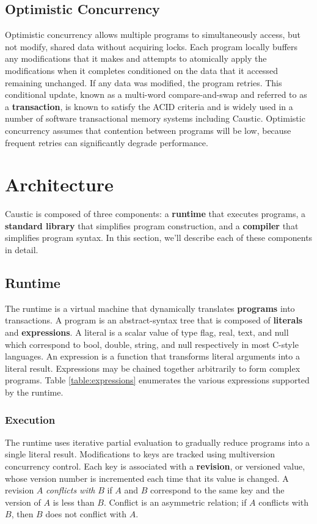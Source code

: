 \documentclass[12pt]{article}
\begin{document}
\subsection{Optimistic Concurrency}
Optimistic concurrency allows multiple programs to simultaneously access, but not modify, shared
data without acquiring locks. Each program locally buffers any modifications that it makes and
attempts to atomically apply the modifications when it completes conditioned on the data that it
accessed remaining unchanged. If any data was modified, the program retries. This conditional
update, known as a multi-word compare-and-swap and referred to as a \textbf{transaction}, is known
to satisfy the ACID criteria and is widely used in a number of software transactional memory
systems including Caustic. \cite{stm} Optimistic concurrency assumes that contention between
programs will be low, because frequent retries can significantly degrade performance.

\section{Architecture}
Caustic is composed of three components: a \textbf{runtime} that executes programs, a
\textbf{standard library} that simplifies program construction, and a \textbf{compiler} that
simplifies program syntax. In this section, we'll describe each of these components in detail.

\subsection{Runtime}
The runtime is a virtual machine that dynamically translates \textbf{programs} into transactions.
A program is an abstract-syntax tree that is composed of \textbf{literals} and
\textbf{expressions}. A literal is a scalar value of type flag, real, text, and null which
correspond to bool, double, string, and null respectively in most C-style languages. An expression
is a function that transforms literal arguments into a literal result. Expressions may be chained
together arbitrarily to form complex programs. Table \ref{table:expressions} enumerates the
various expressions supported by the runtime.

\subsubsection{Execution}
The runtime uses iterative partial evaluation to gradually reduce programs into a single literal
result. Modifications to keys are tracked using multiversion concurrency control. Each key is
associated with a \textbf{revision}, or versioned value, whose version number is incremented
each time that its value is changed. A revision $A$ \emph{conflicts with} $B$ if $A$ and $B$
correspond to the same key and the version of $A$ is less than $B$. Conflict is an asymmetric
relation; if $A$ conflicts with $B$, then $B$ does not conflict with $A$.
\end{document}
